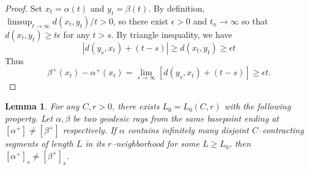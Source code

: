 \documentclass{amsart}
\newtheorem{lem}[thm]{Lemma}
\theoremstyle{definition}
\theoremstyle{remark}
\newcommand{\ywy}[1]{{\color{blue}{#1}}}
\begin{document}
\begin{proof}
Set $x_t=\alpha(t)$ and $y_t=\beta(t)$. By definition, $\limsup_{t\to\infty}d(x_t, y_t)/t>0$, so there exist $\epsilon>0$ and $t_n\to \infty$ so that $d(x_t, y_t)\ge t \epsilon$ for any $t>s$. By triangle inequality, we have \[ |d(y_s,x_t)+(t-s)| \geq d(x_t, y_t) \geq \epsilon t \]
\ywy{Unfortunately, this inequality does not from triangle inequality: $\geq$ should be $\leq$, right? In general, the right hand side is the Gromov product, and without hyperbolicity, we could not obtain  $\geq$. }
Thus 
\[\beta^+(x_t)-\alpha^+(x_t)=\lim_{s\to\infty}[d(y_s,x_t)+(t-s)]
\geq\epsilon t.\]   
\end{proof}
\fi



\begin{lem}\label{SublinearClassLem}
For any $C,r>0$, there exists $L_0=L_0(C,r)$ with the following property. Let $\alpha,\beta$ be two geodesic rays from the same basepoint ending at $[\alpha^+]\ne [\beta^+]$ respectively. If $\alpha$ contains infinitely many disjoint $C$--contracting segments of length $L$ in its $r$--neighborhood for some $L\ge L_0$, then  $[\alpha^+]_s\ne [\beta^+]_s$.    
\end{lem}
\end{document}
